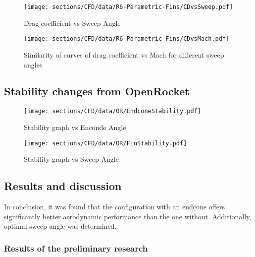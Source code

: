 \begin{figure}[H]
    \centering
    \texttt{[image: sections/CFD/data/R6-Parametric-Fins/CDvsSweep.pdf]}
    \caption{Drag coefficient vs Sweep Angle}
    \label{fig:CdVsSweep}
\end{figure}

\begin{figure}[H]
    \centering
    \texttt{[image: sections/CFD/data/R6-Parametric-Fins/CDvsMach.pdf]}
    \caption{Similarity of curves of drag coefficient vs Mach for different sweep angles}
\end{figure}

\subsection{Stability changes from OpenRocket}
\begin{figure}[H]
    \centering
    \texttt{[image: sections/CFD/data/OR/EndconeStability.pdf]}
    \caption{Stability graph vs Enconde Angle}
\end{figure}
\begin{figure}[H]
    \centering
    \texttt{[image: sections/CFD/data/OR/FinStability.pdf]}
    \caption{Stability graph vs Sweep Angle}
\end{figure}
\subsection{Results and discussion}
In conclusion, it was found that the configuration with an endcone offers significantly better 
aerodynamic performance than the one without. Additionally, optimal sweep angle was determined.
\subsubsection{Results of the preliminary research}

